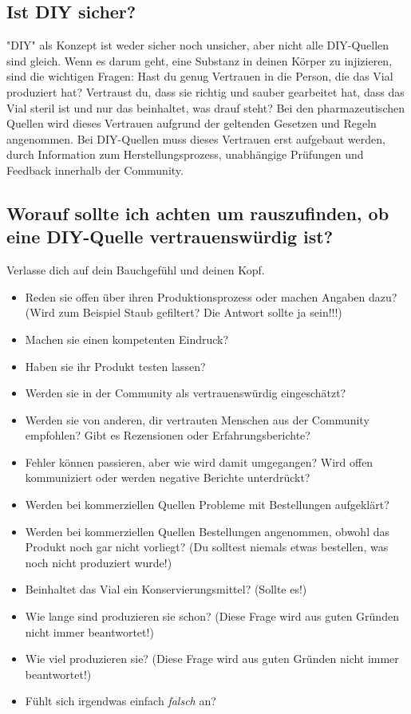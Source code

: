\documentclass{article}
\begin{document}
\subsection{Ist DIY sicher?}

"DIY" als Konzept ist weder sicher noch unsicher, aber nicht alle DIY-Quellen sind gleich. Wenn es darum geht, eine Substanz in deinen Körper zu injizieren, sind die wichtigen Fragen: Hast du genug Vertrauen in die Person, die das Vial produziert hat? Vertraust du, dass sie richtig und sauber gearbeitet hat, dass das Vial steril ist und nur das beinhaltet, was drauf steht? Bei den pharmazeutischen Quellen wird dieses Vertrauen aufgrund der geltenden Gesetzen und Regeln angenommen. Bei DIY-Quellen muss dieses Vertrauen erst aufgebaut werden, durch Information zum Herstellungsprozess, unabhängige Prüfungen und Feedback innerhalb der Community.

\subsection{Worauf sollte ich achten um rauszufinden, ob eine DIY-Quelle vertrauenswürdig ist?}

Verlasse dich auf dein Bauchgefühl und deinen Kopf. 

\begin{itemize}
  \item Reden sie offen über ihren Produktionsprozess oder machen Angaben dazu? (Wird zum Beispiel Staub gefiltert? Die Antwort sollte ja sein!!!)
  \item Machen sie einen kompetenten Eindruck?
  \item Haben sie ihr Produkt testen lassen? 
  \item Werden sie in der Community als vertrauenswürdig eingeschätzt?
  \item Werden sie von anderen, dir vertrauten Menschen aus der Community empfohlen? Gibt es Rezensionen oder Erfahrungsberichte? 
  \item Fehler können passieren, aber wie wird damit umgegangen? Wird offen kommuniziert oder werden negative Berichte unterdrückt?
  \item Werden bei kommerziellen Quellen Probleme mit Bestellungen aufgeklärt?
  \item Werden bei kommerziellen Quellen Bestellungen angenommen, obwohl das Produkt noch gar nicht vorliegt? (Du solltest niemals etwas bestellen, was noch nicht produziert wurde!)
  \item Beinhaltet das Vial ein Konservierungsmittel? (Sollte es!)
  \item Wie lange sind produzieren sie schon? (Diese Frage wird aus guten Gründen nicht immer beantwortet!)
  \item Wie viel produzieren sie? (Diese Frage wird aus guten Gründen nicht immer beantwortet!)
  \item Fühlt sich irgendwas einfach \textit{falsch} an?
\end{itemize}
\end{document}
